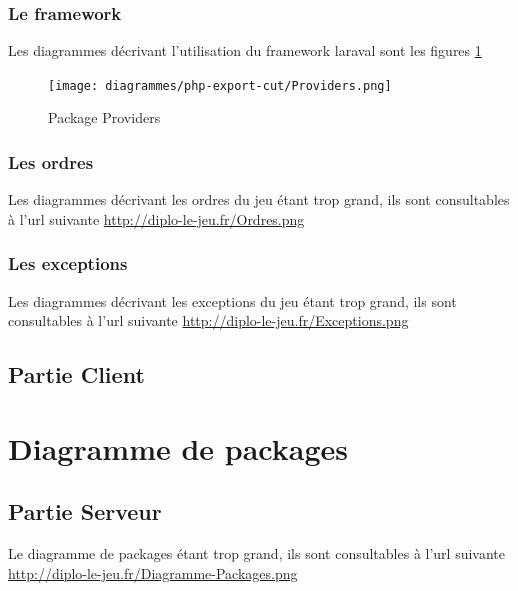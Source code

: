         \newpage
        \subsubsection{Le framework}
        Les diagrammes décrivant l'utilisation du framework laraval sont les figures \ref{pproviders}
			\begin{figure}[!h]
				\centering
                \texttt{[image: diagrammes/php-export-cut/Providers.png]}
                \caption{\label{pproviders}Package Providers}
			\end{figure}
        \newpage

        \newpage
		\subsubsection{Les ordres}
        Les diagrammes décrivant les ordres du jeu étant trop grand, ils sont consultables à l'url suivante \url{http://diplo-le-jeu.fr/Ordres.png}

        \newpage
		\subsubsection{Les exceptions}
        Les diagrammes décrivant les exceptions du jeu étant trop grand, ils sont consultables à l'url suivante \url{http://diplo-le-jeu.fr/Exceptions.png}

        
    \pagebreak
	\subsection{Partie Client}

    \newpage
\section{Diagramme de packages}
	\subsection{Partie Serveur}
        Le diagramme de packages étant trop grand, ils sont consultables à l'url suivante \url{http://diplo-le-jeu.fr/Diagramme-Packages.png}

		\newpage

